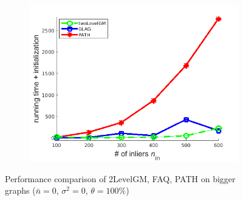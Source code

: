 \begin{figure}[h]
\begin{subfigure}[b]{0.32\textwidth}
			\includegraphics[scale=0.25]{"chapter3/fig/SyntheticTest_BigGraphs/descr/Results_v4.3.3/Test1/time_summary_avg1t"} 
		\end{subfigure} 	
	\caption[Performance comparison of 2LevelGM, FAQ, PATH on bigger graphs: test $1$]{Performance comparison of 2LevelGM, FAQ, PATH on bigger graphs ($\bar{n}=0$, $\sigma^2=0$, $\theta=100\%$)}
	\label{fig:synTest1_bigGraphs_ver433}
\end{figure}
